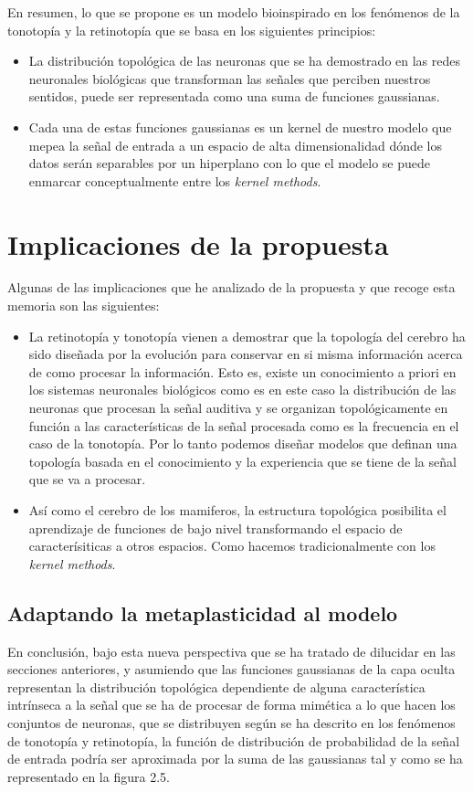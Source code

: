 \documentclass[10pt,a4paper]{report}
\begin{document}
En resumen, lo que se propone es un modelo bioinspirado en los fenómenos de la tonotopía y la retinotopía que se basa en los siguientes principios:
\begin{itemize}
	\item La distribución topológica de las neuronas que se ha demostrado en las redes neuronales biológicas que transforman las señales que perciben nuestros sentidos, puede ser representada como una suma de funciones gaussianas.
	\item Cada una de estas funciones gaussianas es un kernel de nuestro modelo que mepea la señal de entrada a un espacio de alta dimensionalidad dónde los datos serán separables por un hiperplano con lo que el modelo se puede enmarcar conceptualmente entre los \textit{kernel methods}.
\end{itemize}

\section{Implicaciones de la propuesta}
Algunas de las implicaciones que he analizado de la propuesta y que recoge esta memoria son las siguientes:
\begin{itemize}
	\item La retinotopía y tonotopía vienen a demostrar que la topología del cerebro ha sido diseñada por la evolución para conservar en si misma información acerca de como procesar la información. Esto es, existe un conocimiento a priori en los sistemas neuronales biológicos como es en este caso la distribución de las neuronas que procesan la señal auditiva y se organizan topológicamente en función a las características de la señal procesada como es la frecuencia en el caso de la tonotopía. Por lo tanto podemos diseñar modelos que definan una topología basada en el conocimiento y la experiencia que se tiene de la señal que se va a procesar.
	\item Así como el cerebro de los mamiferos, la estructura topológica posibilita el aprendizaje de funciones de bajo nivel transformando el espacio de caracterísiticas a otros espacios. Como hacemos tradicionalmente con los \textit{kernel methods}.
\end{itemize}

\subsection{Adaptando la metaplasticidad al modelo}
En conclusión, bajo esta nueva perspectiva que se ha tratado de dilucidar en las secciones anteriores, y asumiendo que las funciones gaussianas de la capa oculta representan la distribución topológica dependiente de alguna característica intrínseca a la señal que se ha de procesar de forma mimética a lo que hacen los conjuntos de neuronas, que se distribuyen según se ha descrito en los fenómenos de tonotopía y retinotopía, la función de distribución de probabilidad de la señal de entrada podría ser aproximada por la suma de las gaussianas tal y como se ha representado en la figura 2.5. 
\end{document}
